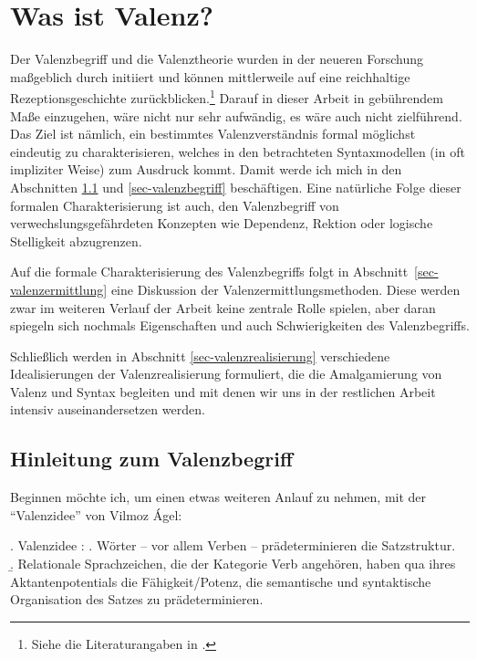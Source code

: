 \chapter{Was ist Valenz?} \label{ch-mit-valenz}

Der Valenzbegriff und die Valenztheorie wurden in der neueren Forschung ma\ss geblich durch \cite{Tesniere:59} initiiert und können mittlerweile auf eine reichhaltige Rezeptionsgeschichte zurückblicken.\footnote{Siehe die Literaturangaben in \citet[9]{Agel:00}.} Darauf in dieser Arbeit in gebührendem Ma\ss e einzugehen, wäre nicht nur sehr aufwändig, es wäre auch nicht zielführend. Das Ziel ist nämlich, ein bestimmtes Valenzverständnis formal möglichst eindeutig zu charakterisieren, welches in den betrachteten Syntaxmodellen (in oft impliziter Weise) zum Ausdruck kommt. Damit werde ich mich in den Abschnitten \ref{sec:valenz:hinführung} und \ref{sec-valenzbegriff} beschäftigen. Eine natürliche Folge dieser formalen Charakterisierung ist auch, den Valenzbegriff von verwechslungsgefährdeten Konzepten wie Dependenz, Rektion oder logische Stelligkeit abzugrenzen.%

Auf die formale Charakterisierung des Valenzbegriffs folgt in Abschnitt~\ref{sec-valenzermittlung} eine Diskussion der Valenzermittlungsmethoden. Diese werden zwar im weiteren Verlauf der Arbeit keine zentrale Rolle spielen, aber daran spiegeln sich nochmals Eigenschaften und auch Schwierigkeiten des Valenzbegriffs.  

Schlie\ss lich werden in Abschnitt \ref{sec-valenzrealisierung} verschiedene Idealisierungen der Valenzrealisierung formuliert, die die Amalgamierung von Valenz und Syntax begleiten und mit denen wir uns in der restlichen Arbeit intensiv auseinandersetzen werden.

\section{Hinleitung zum Valenzbegriff} \label{sec:valenz:hinführung}

Beginnen möchte ich, um einen etwas weiteren Anlauf zu nehmen, mit der "`Valenzidee"' von Vilmoz \'Agel:
 
\ex. Valenzidee \citep[105]{Agel:00}: 
\a. Wörter -- vor allem Verben -- prädeterminieren die Satzstruktur.\\ \citep[7]{Agel:00} 
\b. Relationale Sprachzeichen, die der Kategorie Verb angehören, haben qua ihres Aktantenpotentials die Fähigkeit/Potenz, die semantische und syntaktische Organisation des Satzes zu prädeterminieren.

